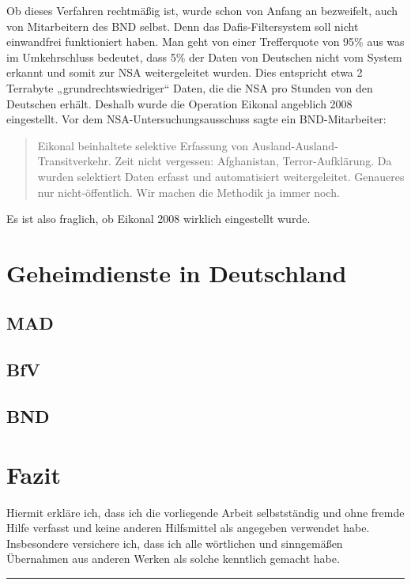 \documentclass[12pt,a4paper]{scrartcl}
\begin{document}
Ob dieses Verfahren rechtmäßig ist, wurde schon von Anfang an bezweifelt, auch von Mitarbeitern des BND selbst. Denn das Dafis-Filtersystem soll nicht einwandfrei funktioniert haben. Man geht von einer Trefferquote von 95\% aus was im Umkehrschluss bedeutet, dass 5\% der Daten von Deutschen nicht vom System erkannt und somit zur NSA weitergeleitet wurden. Dies entspricht etwa 2 Terrabyte „grundrechtswiedriger“ Daten, die die NSA pro Stunden von den Deutschen erhält. Deshalb wurde die Operation Eikonal angeblich 2008 eingestellt. Vor dem NSA-Untersuchungsausschuss sagte ein BND-Mitarbeiter:

\begin{quotation}
Eikonal beinhaltete selektive Erfassung von Ausland-Ausland-Transitverkehr. Zeit nicht vergessen: Afghanistan, Terror-Aufklärung. Da wurden selektiert Daten erfasst und automatisiert weitergeleitet. Genaueres nur nicht-öffentlich. Wir machen die Methodik ja immer noch.
\end{quotation}

Es ist also fraglich, ob Eikonal 2008 wirklich eingestellt wurde.
\section{Geheimdienste in Deutschland}

\subsection{MAD}

\subsection{BfV}

\subsection{BND}

\section{Fazit}

\newpage
\printbibliography
\newpage

Hiermit erkläre ich, dass ich die vorliegende Arbeit selbstständig und ohne fremde Hilfe verfasst und keine anderen Hilfsmittel als angegeben verwendet habe. Insbesondere versichere ich, dass ich alle wörtlichen und sinngemäßen Übernahmen aus anderen Werken als solche kenntlich gemacht habe.
\vspace{2cm}
\hrule
\end{document}
